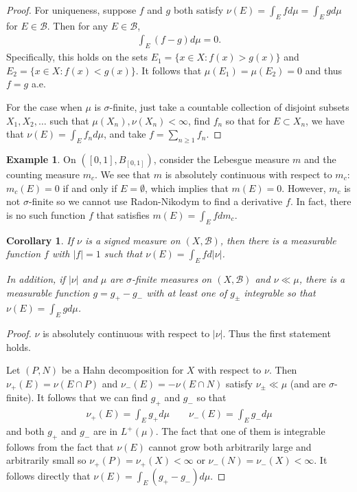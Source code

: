 \documentclass[11pt]{amsart}
\newtheorem{corollary}[theorem]{Corollary}
\theoremstyle{definition}
\newtheorem{example}[theorem]{Example}
\numberwithin{equation}{section}
\begin{document}
\begin{proof}
    For uniqueness, suppose $f$ and $g$ both satisfy $\nu(E)=\int_Efd\mu=\int_Egd\mu$ for $E\in\mathcal B$. Then for any $E\in \mathcal B$,
    \begin{align*}
        \int_E(f-g)d\mu=0.
    \end{align*}
    Specifically, this holds on the sets $E_1=\{x\in X:f(x)>g(x)\}$ and $E_2=\{x\in X:f(x)<g(x)\}$. It follows that $\mu(E_1)=\mu(E_2)=0$ and thus $f=g$ a.e.

    For the case when $\mu$ is $\sigma$-finite, just take a countable collection of disjoint subsets $X_1,X_2,\ldots$ such that $\mu(X_n),\nu(X_n)<\infty$, find $f_n$ so that for $E\subset X_n$, we have that $\nu(E)=\int_Ef_nd\mu$, and take $f=\sum_{n\ge 1}f_n$.
\end{proof}
\begin{example}
    On $([0,1],B_{[0,1]})$, consider the Lebesgue measure $m$ and the counting measure $m_c$. We see that $m$ is absolutely continuous with respect to $m_c$: $m_c(E)=0$ if and only if $E=\emptyset$, which implies that $m(E)=0$. However, $m_c$ is not $\sigma$-finite so we cannot use Radon-Nikodym to find a derivative $f$. In fact, there is no such function $f$ that satisfies $m(E)=\int_Efdm_c$.
\end{example}
\begin{corollary}
    If $\nu$ is a signed measure on $(X,\mathcal B)$, then there is a measurable function $f$ with $|f|=1$ such that $\nu(E)=\int_Efd|\nu|$.

    In addition, if $|\nu|$ and $\mu$ are $\sigma$-finite measures on $(X,\mathcal B)$ and $\nu\ll\mu$, there is a measurable function $g=g_+-g_-$ with at least one of $g_\pm$ integrable so that $\nu(E)=\int_Egd\mu$.
\end{corollary}
\begin{proof}
    $\nu$ is absolutely continuous with respect to $|\nu|$. Thus the first statement holds.

    Let $(P,N)$ be a Hahn decomposition for $X$ with respect to $\nu$. Then $\nu_+(E)=\nu(E\cap P)$ and $\nu_-(E)=-\nu(E\cap N)$ satisfy $\nu_\pm\ll \mu$ (and are $\sigma$-finite). It follows that we can find $g_+$ and $g_-$ so that 
    \begin{align*}
        \nu_+(E)=\int_Eg_+d\mu\qquad\nu_-(E)=\int_Eg_-d\mu
    \end{align*}
    and both $g_+$ and $g_-$ are in $L^+(\mu)$. The fact that one of them is integrable follows from the fact that $\nu(E)$ cannot grow both arbitrarily large and arbitrarily small so $\nu_+(P)=\nu_+(X)<\infty$ or $\nu_-(N)=\nu_-(X)<\infty$. It follows directly that $\nu(E)=\int_E(g_+-g_-)d\mu$.
\end{proof}
\end{document}
